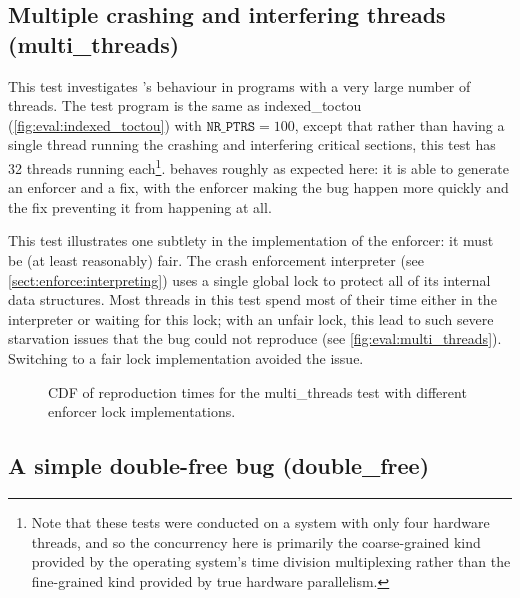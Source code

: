 \subsection{Multiple crashing and interfering threads (multi\_threads)}

This test investigates {\implementation}'s behaviour in programs with
a very large number of threads.  The test program is the same as
indexed\_toctou (\autoref{fig:eval:indexed_toctou}) with
$\texttt{NR\_PTRS} = 100$, except that rather than having a single
thread running the crashing and interfering critical sections, this
test has 32 threads running each\footnote{Note that these tests were
  conducted on a system with only four hardware threads, and so the
  concurrency here is primarily the coarse-grained kind provided by
  the operating system's time division multiplexing rather than the
  fine-grained kind provided by true hardware parallelism.}.
{\Technique} behaves roughly as expected here: it is able to generate
an enforcer and a fix, with the enforcer making the bug happen more
quickly and the fix preventing it from happening at all.

 This test illustrates one
subtlety in the implementation of the enforcer: it must be (at least
reasonably) fair.  The {\implementation} crash enforcement interpreter
(see \autoref{sect:enforce:interpreting}) uses a single global lock to
protect all of its internal data structures.  Most threads in this
test spend most of their time either in the interpreter or waiting for
this lock; with an unfair lock, this lead to such severe starvation
issues that the bug could not reproduce (see
\autoref{fig:eval:multi_threads}).  Switching to a fair lock
implementation avoided the issue.

\begin{figure}
  
  \caption{CDF of reproduction times for the multi\_threads test with
    different enforcer lock implementations.}
  \label{fig:eval:multi_threads}
\end{figure}

\subsection{A simple double-free bug (double\_free)}


